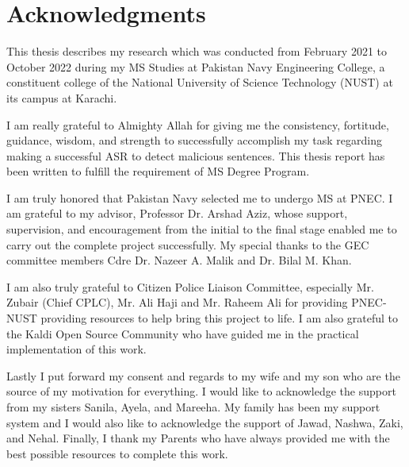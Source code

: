     \newpage
    \chapter*{Acknowledgments}
This thesis describes my research which was conducted from February 2021 to October 2022 during my MS Studies at Pakistan Navy Engineering College, a constituent college of the National University of Science Technology (NUST) at its campus at Karachi.
    \par
I am really grateful to Almighty Allah for giving me the consistency, fortitude, guidance, wisdom, and strength to successfully accomplish my task regarding making a successful ASR to detect malicious sentences. This thesis report has been written to fulfill the requirement of MS Degree Program.
    \par 
I am truly honored that Pakistan Navy selected me to undergo MS at PNEC. I am grateful to my advisor, Professor Dr. Arshad Aziz, whose support, supervision, and encouragement from the initial to the final stage enabled me to carry out the complete project successfully. My special thanks to the GEC committee members Cdre Dr. Nazeer A. Malik and Dr. Bilal M. Khan.
    \par
I am also truly grateful to Citizen Police Liaison Committee, especially Mr. Zubair (Chief CPLC), Mr. Ali Haji and Mr. Raheem Ali for providing PNEC-NUST providing resources to help bring this project to life. I am also grateful to the Kaldi Open Source Community who have guided me in the practical implementation of this work.  
    \par
Lastly I put forward my consent and regards to my wife and my son who are the source of my motivation for everything. I would like to acknowledge the support from my sisters Sanila, Ayela, and Mareeha. My family has been my support system and I would also like to acknowledge the support of Jawad, Nashwa, Zaki, and Nehal. Finally, I thank my Parents who have always provided me with the best possible resources to complete this work.